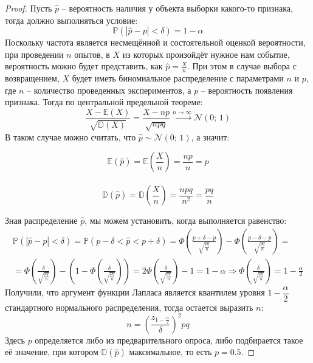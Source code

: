 \documentclass[12pt]{article}
\theoremstyle{definition}
\newcommand{\E}{\mathbb{E}}
\newcommand{\D}{\mathbb{D}}
\newcommand{\prob}{\mathbb{P}}
\newcommand{\nd}{\mathcal{N}}
\begin{document}
\begin{proof}
    Пусть $\hat{p}$ – вероятность наличия у объекта выборки какого-то признака, тогда должно выполняться условие:
    $$\prob(|\hat{p}-p|<\delta)=1-\alpha$$
    Поскольку частота является несмещённой и состоятельной оценкой вероятности, при проведении $n$ опытов, в $X$ из которых произойдёт нужное нам событие, вероятность можно будет представить, как $\hat{p}=\frac{X}{n}$. При этом в случае выбора с возвращением, $X$ будет иметь биномиальное распределение с параметрами $n$ и $p$, где $n$ – количество проведенных экспериментов, а $p$ – вероятность появления признака. Тогда по центральной предельной теореме:
    $$\frac{X-\E(X)}{\sqrt{\D(X)}}=\frac{X-np}{\sqrt{npq}}\xrightarrow{n\to\infty}\nd(0;\,1)$$
    В таком случае можно считать, что $\hat{p}\sim\nd(0;\,1)$, а значит:
    \begin{center}
        \begin{multicols}{2}
            \[\E(\hat{p})=\E\left(\frac{X}{n}\right)=\frac{np}{n}=p\]\\
            \[\D(\hat{p})=\D\left(\frac{X}{n}\right)=\frac{npq}{n^2}=\frac{pq}{n}\]
        \end{multicols}
    \end{center}
    Зная распределение $\hat{p}$, мы можем установить, когда выполняется равенство:
    \begin{multline*}
        \prob(|\hat{p}-p|<\delta)=\prob(p-\delta<\hat{p}<p+\delta)=\Phi\left(\frac{p+\delta-p}{\sqrt{\frac{pq}{n}}}\right) - \Phi\left(\frac{p-\delta-p}{\sqrt{\frac{pq}{n}}}\right)=\\
        =\Phi\left(\frac{\delta}{\sqrt{\frac{pq}{n}}}\right) - \left(1 - \Phi\left(\frac{\delta}{\sqrt{\frac{pq}{n}}}\right)\right)=2\Phi\left(\frac{\delta}{\sqrt{\frac{pq}{n}}}\right)-1=1-\alpha\Longrightarrow \Phi\left(\frac{\delta}{\sqrt{\frac{pq}{n}}}\right) = 1-\frac{\alpha}{2}
    \end{multline*}
    Получили, что аргумент функции Лапласа является квантилем уровня $1-\dfrac{\alpha}{2}$ стандартного нормального распределения, тогда остается выразить $n$:
    $$n=\left(\frac{z_{1-\frac{\alpha}{2}}}{\delta}\right)^2pq$$
    Здесь $p$ определяется либо из предварительного опроса, либо подбирается такое её значение, при котором $\D(\hat{p})$ максимальное, то есть $p=\num{0.5}$.
\end{proof}
\end{document}
